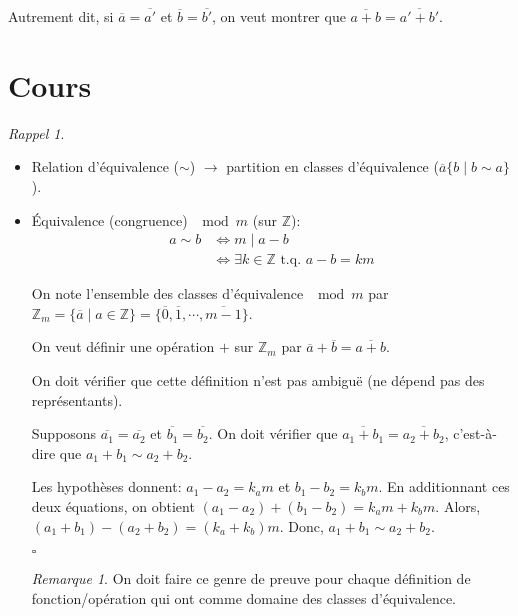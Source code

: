 \documentclass{report}
\newcounter{cours}
\newcommand*{\cours}{\section*{Cours \thecours}\stepcounter{cours}}
\newcommand*{\entiers}{\mathbb{Z}}
\theoremstyle{definition}
\theoremstyle{remark}
\newtheorem*{rema}{Remarque}
\newtheorem*{rappel}{Rappel}
\begin{document}
	Autrement dit, si $\overline{a} = \overline{a'}$ et $\overline{b} = \overline{b'}$, on veut montrer que $\overline{a+b} = \overline{a'+b'}$.

	\cours
	\begin{rappel}
		~

		\begin{itemize}[label=\textbullet]
			\item Relation d'\'equivalence ($\sim$) $\rightarrow$ partition en classes d'\'equivalence ($\overline{a}\{b \mid b \sim a\}$).
			\item \'Equivalence (congruence) $\mod m$ (sur $\entiers$):
			\begin{align*}
				a \sim b&\Leftrightarrow m \mid a-b\\
				&\Leftrightarrow \exists k \in \entiers \text{ t.q. } a-b=km
			\end{align*}

			On note l'ensemble des classes d'\'equivalence $\mod m$ par $\entiers_m = \{\overline{a} \mid a \in \entiers\} = \{\overline{0}, \overline{1}, \dotsb, \overline{m-1}\}$.

			On veut d\'efinir une op\'eration $+$ sur $\entiers_m$ par $\overline{a} + \overline{b} = \overline{a+b}$.

			On doit v\'erifier que cette d\'efinition n'est pas ambigu\"e (ne d\'epend pas des repr\'esentants).

			Supposons $\overline{a_1} = \overline{a_2}$ et $\overline{b_1} = \overline{b_2}$. On doit v\'erifier que $\overline{a_1+b_1} = \overline{a_2+b_2}$, c'est-\`a-dire que $a_1+b_1 \sim a_2+b_2$.

			Les hypoth\`eses donnent: $a_1-a_2=k_am$ et $b_1-b_2=k_bm$. En additionnant ces deux \'equations, on obtient $(a_1-a_2)+(b_1-b_2) = k_am+k_bm$. Alors, $(a_1+b_1) - (a_2+b_2) = (k_a+k_b)m$. Donc, $a_1+b_1 \sim a_2+b_2$.
			\begin{flushright}
				$\square$
			\end{flushright}
			\begin{rema}
				On doit faire ce genre de preuve pour chaque d\'efinition de fonction/op\'eration qui ont comme domaine des classes d'\'equivalence.
			\end{rema}
		\end{itemize}
	\end{rappel}
\end{document}
